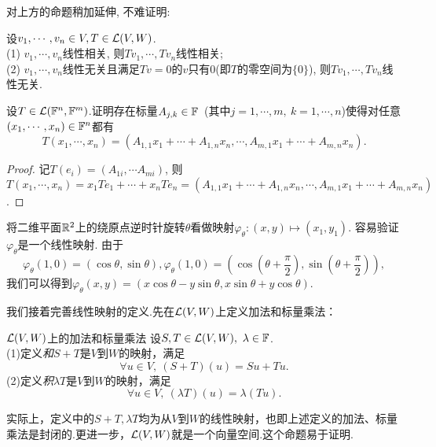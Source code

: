 对上方的命题稍加延伸, 不难证明: 

\begin{proposition}{}
	设$v_1,\cdots ,v_n \in V, T \in \mathcal{L} (V,W)$. \\
	(1) $v_1,\cdots ,v_n$线性相关, 则$Tv_1,\cdots ,Tv_n$线性相关; \\
	(2) $v_1,\cdots ,v_n$线性无关且满足$Tv=0$的$v$只有$0$(即$T$的零空间为$\{ 0 \}$), 则$Tv_1,\cdots ,Tv_n$线性无关. 
\end{proposition}

\begin{example}
	设$T \in \mathcal{L} (\mathbb{F} ^n,\mathbb{F} ^m)$.证明存在标量$A_{j,k} \in \mathbb{F}$~(其中$j=1, \cdots ,m,~k=1,\cdots ,n$)使得对任意$(x_1, \cdots ,x_n) \in \mathbb{F} ^n$都有$$T(x_1, \cdots ,x_n) = (A_{1,1}x_1+ \cdots +A_{1,n}x_n, \cdots ,A_{m,1}x_1+\cdots +A_{m,n}x_n).$$
\end{example}
\begin{proof}
	记$T(e_i)=(A_{1i},\cdots A_{mi})$, 则$T(x_1,\cdots ,x_n)=x_1Te_1+\cdots + x_nTe_n = (A_{1,1}x_1+ \cdots +A_{1,n}x_n, \cdots ,A_{m,1}x_1+\cdots +A_{m,n}x_n)$.
\end{proof}

\begin{example}
	将二维平面$\mathbb{R} ^2$上的绕原点逆时针旋转$\theta$看做映射$\varphi _{\theta} : (x,y) \mapsto (x_1,y_1)$. 容易验证$\varphi _{\theta}$是一个线性映射. 由于$$\varphi _{\theta} (1,0) = (\cos \theta , \sin \theta) , \varphi _{\theta} (1,0) = (\cos \left( \theta + \frac{\pi}{2} \right) , \sin \left( \theta + \frac{\pi}{2} \right)),$$
	我们可以得到$\varphi _{\theta} (x,y) = (x\cos \theta - y\sin \theta ,x\sin \theta + y\cos \theta)$.
\end{example}

我们接着完善线性映射的定义.先在$\mathcal{L} (V,W)$上定义加法和标量乘法：

\begin{definition}{$\mathcal{L} (V,W)$上的加法和标量乘法}
	设$S,T \in \mathcal{L} (V,W),~\lambda \in \mathbb{F}$. \\
	(1)定义\textit{和}$S+T$是$V$到$W$的映射，满足$$\forall u \in V,~(S+T)(u)=Su+Tu.$$
	(2)定义\textit{积}$\lambda T$是$V$到$W$的映射，满足$$\forall u \in V,~(\lambda T)(u) = \lambda (Tu).$$
\end{definition}
\begin{remark}
	实际上，定义中的$S+T,\lambda T$均为从$V$到$W$的线性映射，也即上述定义的加法、标量乘法是封闭的.更进一步，$\mathcal{L} (V,W)$就是一个向量空间.这个命题易于证明.
\end{remark}

